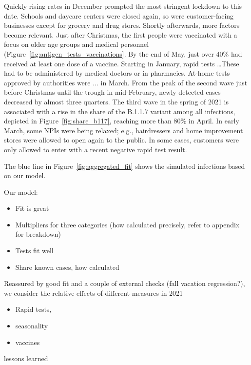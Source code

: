 Quickly rising rates in December prompted the most stringent lockdown to this date. Schools and daycare centers were closed again, so were customer-facing businesses except for grocery and drug stores. Shortly afterwards, more factors become relevant. Just after Christmas, the first people were vaccinated with a focus on older age groups and medical personnel (Figure~\ref{fig:antigen_tests_vaccinations}. By the end of May, just over 40\% had received at least one dose of a vaccine. Starting in January, rapid tests \dots These had to be administered by medical doctors or in pharmacies. At-home tests approved by authorities were ... in March.
From the peak of the second wave just before Christmas until the trough in mid-February, newly detected cases decreased by almost three quarters. The third wave in the spring of 2021 is associated with a rise in the share of the B.1.1.7 variant among all infections, depicted in Figure~\ref{fig:share_b117}, reaching more than 80\% in April. In early March, some NPIs were being relaxed; e.g., hairdressers and home improvement stores were allowed to open again to the public. In some cases, customers were only allowed to enter with a recent negative rapid test result. 

The blue line in Figure~\ref{fig:aggregated_fit} shows the simulated infections based on our model.

Our model:
\begin{itemize}
    \item Fit is great
    \item Multipliers for three categories (how calculated precisely, refer to appendix for breakdown)
    \item Tests fit well
    \item Share known cases, how calculated
\end{itemize}



Reassured by good fit and a couple of external checks (fall vacation regression?), we consider the relative effects of different measures in 2021
\begin{itemize}
    \item Rapid tests,
    \item seasonality
    \item vaccines
\end{itemize}

lessons learned


